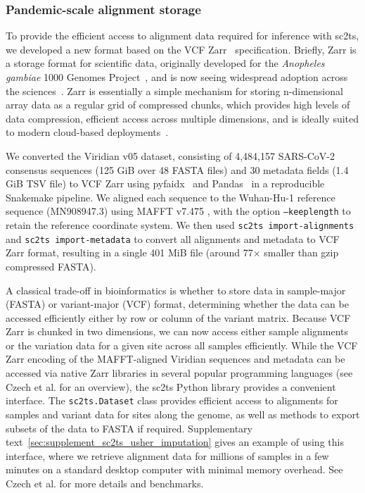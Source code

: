 \documentclass[12pt]{article}
\begin{document}
\subsubsection*{Pandemic-scale alignment storage}
To provide the efficient access to alignment data required for inference with sc2ts,
we developed a new format based on the VCF Zarr~\cite{Czech2025} specification.
Briefly, Zarr is a storage format for scientific data,
originally developed for the
\textit{Anopheles gambiae}
1000 Genomes Project~\cite{Anopheles2017genetic}, and
is now seeing widespread adoption across the
sciences~\cite{Abernathey2021cloud,Moore2021ome,Gowan2022using,
Dhapola2022scarf,Virshup2023scverse,Baker2023emobject,
Marconato2024spatialdata,Ruan2024image}.
Zarr is essentially a simple mechanism for storing n-dimensional array
data as a regular grid of compressed chunks, which provides
high levels of data compression, efficient access across multiple
dimensions, and is ideally suited to modern cloud-based
deployments~\cite{Czech2025}.

We converted the Viridian v05 dataset\cite{Hunt2024}, consisting of 4,484,157 SARS-CoV-2
consensus sequences (125 GiB over 48 FASTA files) and 30 metadata fields (1.4
GiB TSV file) to VCF Zarr using
pyfaidx~\cite{Shirley2015efficient} and Pandas~\cite{Mckinney2010data} in a
reproducible Snakemake\cite{Koster2012snakemake} pipeline.
We aligned each sequence to the Wuhan-Hu-1 reference sequence (MN908947.3) using
MAFFT v7.475 \cite{Katoh2013},
with the option \texttt{--keeplength} to retain the reference coordinate system.
We then used \texttt{sc2ts import-alignments} and
\texttt{sc2ts import-metadata} to convert all alignments and metadata to VCF
Zarr format, resulting in a single 401 MiB file
(around 77$\times$ smaller than gzip compressed FASTA\cite{Czech2025}).

A classical trade-off in bioinformatics is whether to store data
in sample-major (FASTA) or variant-major (VCF) format, determining
whether the data can be accessed efficiently either by row or column
of the variant matrix. Because VCF Zarr is chunked in two dimensions,
we can now access either sample alignments or the variation
data for a given site across all samples efficiently.
While the VCF Zarr encoding of the MAFFT-aligned Viridian sequences
and metadata can be accessed via native Zarr libraries in several
popular programming languages (see Czech et al.\cite{Czech2025}
for an overview), the sc2ts Python library provides a convenient interface.
The \texttt{sc2ts.Dataset}
class provides efficient access to alignments for samples and
variant data for sites along the genome, as well as methods to export
subsets of the data to FASTA if required.
Supplementary text~\ref{sec:supplement_sc2ts_usher_imputation} gives an example
of using this interface, where we retrieve alignment data for millions
of samples in a few minutes on a standard desktop computer with minimal
memory overhead. See Czech et al.\cite{Czech2025} for more details
and benchmarks.
\end{document}
